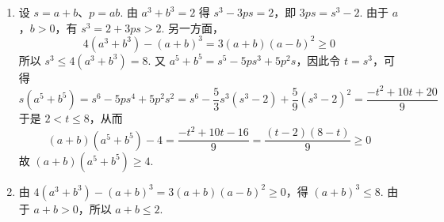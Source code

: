 \begin{solution}
\begin{enumerate}
\item 设 \(s=a+b\)、\(p=ab\). 由 \(a^3+b^3=2\) 得 \(s^3-3ps=2\)，即 \(3ps=s^3-2\). 由于 \(a\)，\(b>0\)，有 \(s^3=2+3ps>2\). 另一方面，
\[
4(a^3+b^3)-(a+b)^3=3(a+b)(a-b)^2\ge0
\]
所以 \(s^3\le4(a^3+b^3)=8\). 又 \(a^5+b^5=s^5-5ps^3+5p^2s\)，因此令 \(t=s^3\)，可得
\[
s(a^5+b^5)=s^6-5ps^4+5p^2s^2=s^6-\frac53s^3(s^3-2)+\frac59(s^3-2)^2=\frac{-t^2+10t+20}{9}
\]
于是 \(2<t\le8\)，从而
\[
(a+b)(a^5+b^5)-4=\frac{-t^2+10t-16}{9}=\frac{(t-2)(8-t)}{9}\ge0
\]
故 \((a+b)(a^5+b^5)\ge4\).
\item 由 \(4(a^3+b^3)-(a+b)^3=3(a+b)(a-b)^2\ge0\)，得 \((a+b)^3\le8\). 由于 \(a+b>0\)，所以 \(a+b\le2\).
\end{enumerate}
\end{solution}
